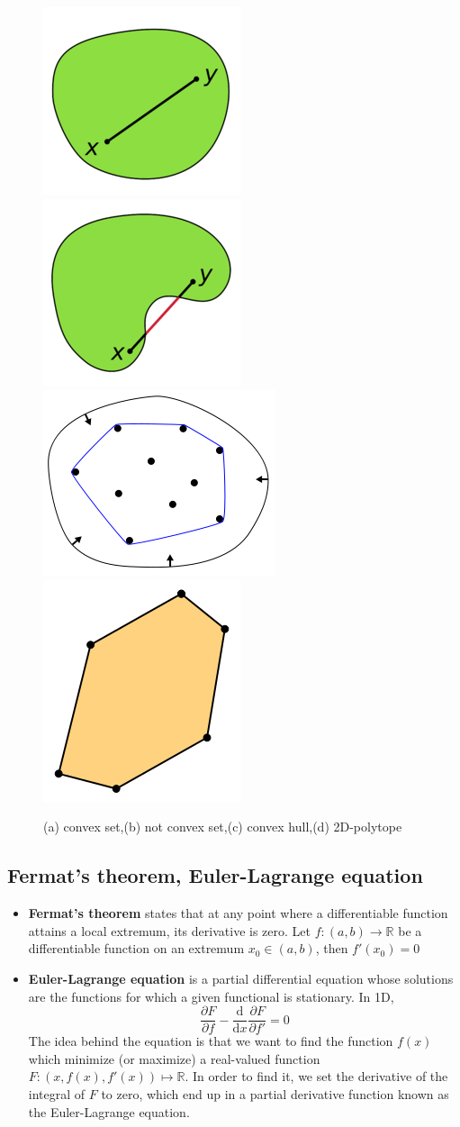 \documentclass[twocolumn]{article}
\numberwithin{equation}{section}
\begin{document}
\begin{figure}[H]
    \includegraphics[width=.11\textwidth]{220px-Convex_polygon_illustration1.png}
    \includegraphics[width=.11\textwidth]{220px-Convex_polygon_illustration2.png}
    \includegraphics[width=.11\textwidth]{258px-ConvexHull_svg.png}
    \includegraphics[width=.11\textwidth]{A_2-dimensional_polytope_svg.png}
    \caption{(a) convex set,(b) not convex set,(c) convex hull,(d) 2D-polytope}
\end{figure}


	\subsection{Fermat's theorem, Euler-Lagrange equation}
\begin{itemize}
	\item \textbf{Fermat's theorem} states that at any point where a differentiable function attains a local extremum, its derivative is zero. Let $f\colon (a,b) \rightarrow \mathbb{R}$ be a differentiable function on an extremum $x_0 \in (a,b)$, then $\displaystyle f'(x_0) = 0$
	
	\item \textbf{Euler-Lagrange equation} is a partial differential equation whose solutions are the functions for which a given functional is stationary. In 1D, 
$$ \frac{\partial F}{\partial f} - \frac{\mathrm{d}}{\mathrm{d}x} \frac{\partial F}{\partial f'} = 0 $$
	The idea behind the equation is that we want to find the function $f(x)$ which minimize (or maximize) a real-valued function $F \colon (x,f(x),f'(x))\mapsto \mathbb{R}$. In order to find it, we set the derivative of the integral of $F$ to zero, which end up in a partial derivative function known as the Euler-Lagrange equation.
\end{itemize}
\end{document}
